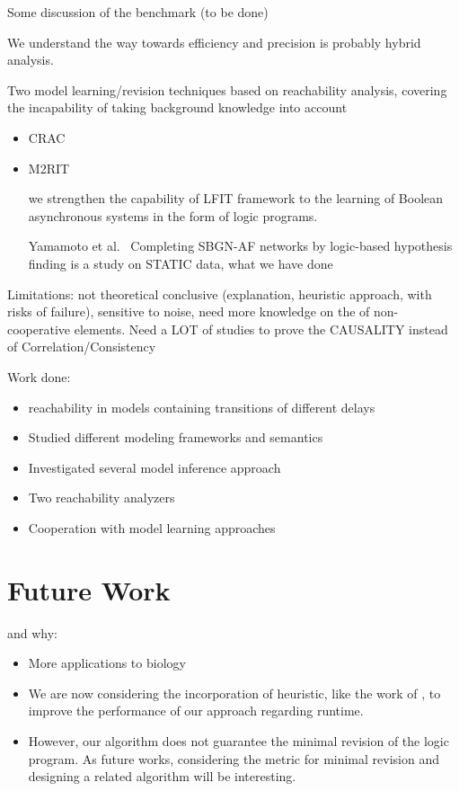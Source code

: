 Some discussion of the benchmark (to be done)

We understand the way towards efficiency and precision is probably hybrid analysis.

Two model learning/revision techniques based on reachability analysis, covering the incapability of taking background knowledge into account
\begin{itemize}
    \item CRAC
    \item M2RIT
    
    we strengthen the capability of LFIT framework to the learning of Boolean asynchronous systems in the form of logic programs.
    
    Yamamoto et al.~\cite{yamamoto2014completing} Completing SBGN-AF networks by logic-based hypothesis finding is a study on STATIC data, what we have done
\end{itemize}


Limitations: not theoretical conclusive (explanation, heuristic approach, with risks of failure), sensitive to noise, need more knowledge on the of non-cooperative elements.
Need a LOT of studies to prove the CAUSALITY instead of Correlation/Consistency


Work done:

\begin{itemize}
    \item reachability in models containing transitions of different delays
    \item Studied different modeling frameworks and semantics
    \item Investigated several model inference approach
    \item Two reachability analyzers
    \item Cooperation with model learning approaches
\end{itemize}

\section{Future Work}

and why:
\begin{itemize}
    \item More applications to biology
    \item We are now considering the incorporation of heuristic, like the work of \cite{PRNs-TCS18}, to improve the performance of our approach regarding runtime.
    \item However, our algorithm does not guarantee the minimal revision of the logic program.
As future works, considering the metric for minimal revision and designing a related algorithm will be interesting.
\end{itemize}